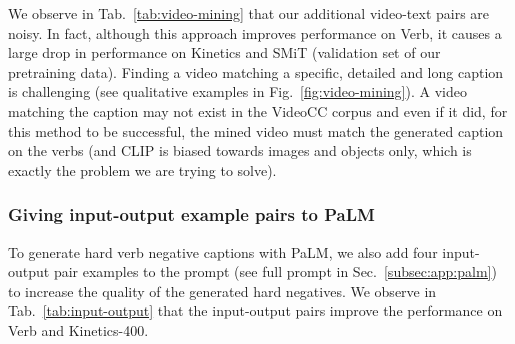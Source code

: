 We observe in Tab.~\ref{tab:video-mining} that our additional video-text pairs are noisy. In fact, although this approach improves performance on Verb, it causes a large drop in performance on Kinetics and SMiT (validation set of our pretraining data). Finding a video matching a specific, detailed and long caption is challenging (see qualitative examples in Fig.~\ref{fig:video-mining}). A video matching the caption may not exist in the VideoCC corpus and even if it did, for this method to be successful, the mined video must match the generated caption on the verbs (and CLIP is biased towards images and objects only, which is exactly the problem we are trying to solve). 







\subsubsection{Giving input-output example pairs to PaLM}\label{subsec:input-output}
To generate hard verb negative captions with PaLM, we also add four input-output pair examples to the prompt (see full prompt in Sec.~\ref{subsec:app:palm}) to increase the quality of the generated hard negatives. We observe in Tab.~\ref{tab:input-output} that the input-output pairs improve the performance on Verb and Kinetics-400.

\begin{table}
    \setlength{\tabcolsep}{22pt}
    \centering
     \vspace{0.2cm}
    \caption{
    \textbf{Inclusion of input-output pairs in PaLM prompt.} We report multi-choice accuracy on Verb~\cite{park-etal-2022-exposing} and Kinetics-400 top-1 accuracy. We observe that including input-output pairs in the PaLM prompt for generating hard negative captions increases the performance on both benchmarks. We note that one hard negative is sampled for each video here.}
    \label{tab:input-output}
 
\end{table}

